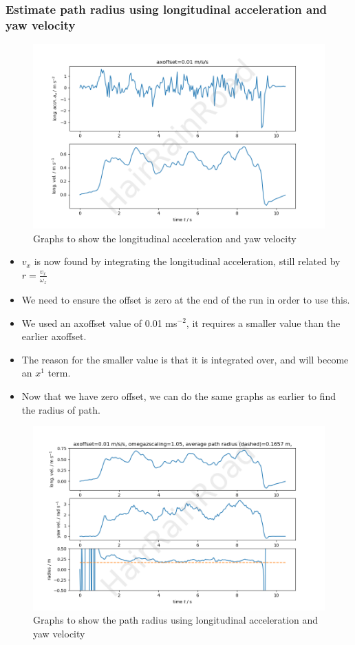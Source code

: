 \documentclass[12pt]{article}
\begin{document}
    \subsubsection{Estimate path radius using longitudinal acceleration and yaw velocity}
    \begin{figure}[H]
        \captionsetup{labelfont=bf}
        \includegraphics[width=40pc]{fig7png.png}
        \caption{Graphs to show the longitudinal acceleration and yaw velocity}\label{figure7}
    \end{figure}
    \begin{itemize}
        \item $v_x$ is now found by integrating the longitudinal acceleration, still related by $r = \frac{v_x}{\omega_z}$
        \item We need to ensure the offset is zero at the end of the run in order to use this.
        \item We used an axoffset value of 0.01 ms$^{-2}$, it requires a smaller value than the earlier axoffset.
        \item The reason for the smaller value is that it is integrated over, and will become an $x^1$ term. 
        \item Now that we have zero offset, we can do the same graphs as earlier to find the radius of path.
    \end{itemize}
    \newpage
    \begin{figure}[H]
        \captionsetup{labelfont=bf}
        \includegraphics[width=40pc]{fig8png.png}
        \caption{Graphs to show the path radius using longitudinal acceleration and yaw velocity}\label{figure8}
    \end{figure}
\end{document}
